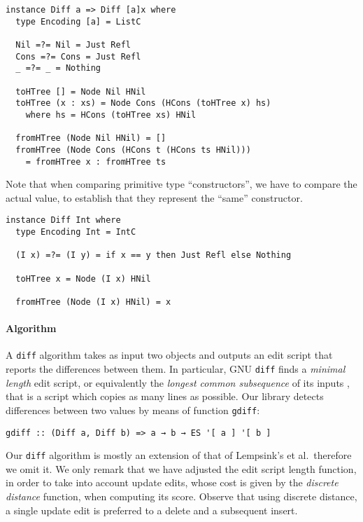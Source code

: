 \documentclass{sigplanconf}
\theoremstyle{plain}
\begin{document}
\begin{verbatim}
instance Diff a => Diff [a]x where	
  type Encoding [a] = ListC

  Nil =?= Nil = Just Refl
  Cons =?= Cons = Just Refl
  _ =?= _ = Nothing

  toHTree [] = Node Nil HNil
  toHTree (x : xs) = Node Cons (HCons (toHTree x) hs)
    where hs = HCons (toHTree xs) HNil

  fromHTree (Node Nil HNil) = []
  fromHTree (Node Cons (HCons t (HCons ts HNil))) 
    = fromHTree x : fromHTree ts
\end{verbatim} 
%
Note that when comparing primitive type ``constructors'',
we have to compare the actual value, to establish 
that they represent the ``same'' constructor.
\begin{verbatim}
instance Diff Int where
  type Encoding Int = IntC

  (I x) =?= (I y) = if x == y then Just Refl else Nothing
  
  toHTree x = Node (I x) HNil
  
  fromHTree (Node (I x) HNil) = x
\end{verbatim}
%
%

\paragraph{Algorithm}
A  \texttt{diff} algorithm takes as input two objects and outputs an
edit script that reports the differences between them.
%
In particular, GNU \texttt{diff} finds a \emph{minimal length} edit
script, or equivalently the \emph{longest common subsequence} of its
inputs \cite{Berg00, PierceDiff3}, that is a script which 
copies as many lines as possible.
%
Our library detects differences between two values by means of function \texttt{gdiff}:
\begin{verbatim}
gdiff :: (Diff a, Diff b) => a → b → ES '[ a ] '[ b ]
\end{verbatim}
%
Our \texttt{diff} algorithm is mostly an extension of that of
Lempsink's et al.\ therefore we omit it.
%
We only remark that we have adjusted the edit script length function,
in order to take into account update edits, whose cost is given by the
\emph{discrete distance} function, when computing its score.
%
%
Observe that using discrete distance, a single update edit is
preferred to a delete and a subsequent insert.
%
\end{document}
